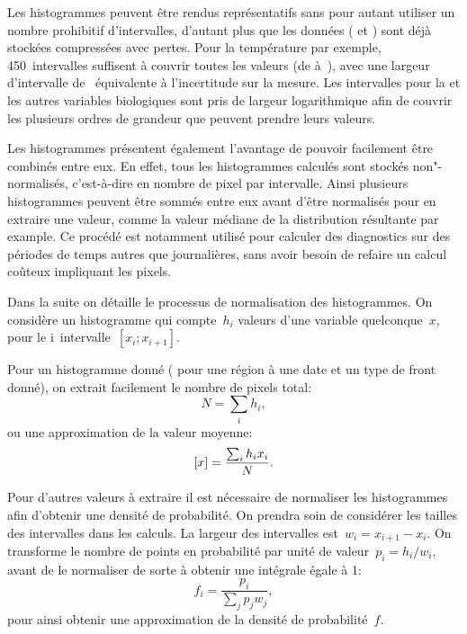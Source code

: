 Les histogrammes peuvent être rendus représentatifs sans pour autant utiliser un nombre prohibitif d'intervalles, d'autant plus que les données ( et ) sont déjà stockées compressées avec pertes. Pour la température par exemple, 450~intervalles suffisent à couvrir toutes les valeurs (de  à~), avec une largeur d'intervalle de~ équivalente à l'incertitude sur la mesure.
Les intervalles pour la  et les autres variables biologiques sont pris de largeur logarithmique afin de couvrir les plusieurs ordres de grandeur que peuvent prendre leurs valeurs.

Les histogrammes présentent également l'avantage de pouvoir facilement être combinés entre eux.
En effet, tous les histogrammes calculés sont stockés non"-normalisés, c'est-à-dire en nombre de pixel par intervalle. Ainsi plusieurs histogrammes peuvent être sommés entre eux avant d'être normalisés pour en extraire une valeur, comme la valeur médiane de la distribution résultante par example.
Ce procédé est notamment utilisé pour calculer des diagnostics sur des périodes de temps autres que journalières, sans avoir besoin de refaire un calcul coûteux impliquant les pixels.

Dans la suite on détaille le processus de normalisation des histogrammes.
On considère un histogramme qui compte~\(h_i\) valeurs d'une variable quelconque~\(x\), pour le i\ieme{}~intervalle~\(\left[x_i; x_{i+1} \right]\).

Pour un histogramme donné ( pour une région à une date et un type de front donné), on extrait facilement le nombre de pixels total:
\begin{equation}
  N = \sum_i h_i,
\end{equation}
ou une approximation de la valeur moyenne:
\begin{equation}
  \left[x\right] = \frac{\sum_i h_i x_i} {N}.
\end{equation}

Pour d'autres valeurs à extraire il est nécessaire de normaliser les histogrammes afin d'obtenir une densité de probabilité. On prendra soin de considérer les tailles des intervalles dans les calculs.
La largeur des intervalles est~\(w_i = x_{i+1}-x_i\). On transforme le nombre de points en probabilité par unité de valeur~\(p_i = h_i / w_i \), avant de le normaliser de sorte à obtenir une intégrale égale à 1:
\begin{equation}
  f_i = \frac{p_i} {\sum_j p_j w_j},
\end{equation}
pour ainsi obtenir une approximation de la densité de probabilité~\(f\).

